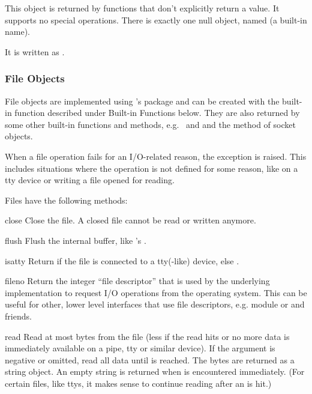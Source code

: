 This object is returned by functions that don't explicitly return a
value.  It supports no special operations.  There is exactly one null
object, named  (a built-in name).

It is written as .

\subsubsection{File Objects}

File objects are implemented using \C{}'s  package and can be
created with the built-in function  described under
Built-in Functions below.  They are also returned by some other
built-in functions and methods, e.g.\  and
 and the  method of socket
objects.

When a file operation fails for an I/O-related reason, the exception
 is raised.  This includes situations where the
operation is not defined for some reason, like  on a tty
device or writing a file opened for reading.

Files have the following methods:


\renewcommand{\indexsubitem}{(file method)}

\begin{funcdesc}{close}{}
  Close the file.  A closed file cannot be read or written anymore.
\end{funcdesc}

\begin{funcdesc}{flush}{}
  Flush the internal buffer, like 's .
\end{funcdesc}

\begin{funcdesc}{isatty}{}
  Return  if the file is connected to a tty(-like) device, else
  .
\end{funcdesc}

\begin{funcdesc}{fileno}{}
Return the integer ``file descriptor'' that is used by the underlying
implementation to request I/O operations from the operating system.
This can be useful for other, lower level interfaces that use file
descriptors, e.g. module  or  and friends.
\end{funcdesc}

\begin{funcdesc}{read}{}
  Read at most  bytes from the file (less if the read hits
  \EOF{} or no more data is immediately available on a pipe, tty or
  similar device).  If the  argument is negative or omitted,
  read all data until \EOF{} is reached.  The bytes are returned as a string
  object.  An empty string is returned when \EOF{} is encountered
  immediately.  (For certain files, like ttys, it makes sense to
  continue reading after an \EOF{} is hit.)
\end{funcdesc}

